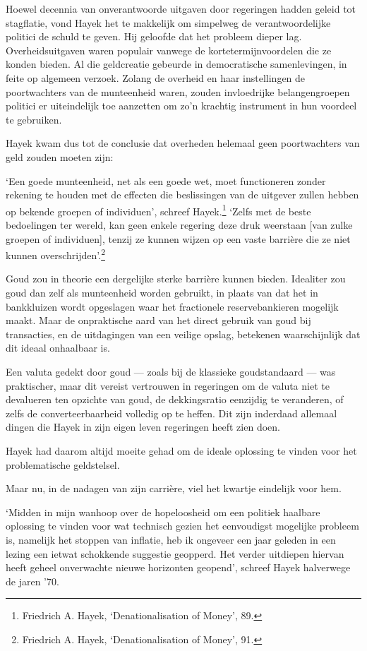 \documentclass[smalldemyvopaper,11pt,twoside,onecolumn,openright,extrafontsizes,hidelinks]{memoir}
\begin{document}
Hoewel decennia van onverantwoorde uitgaven door regeringen hadden
geleid tot stagflatie, vond Hayek het te makkelijk om simpelweg de
verantwoordelijke politici de schuld te geven. Hij geloofde dat het
probleem dieper lag. Overheidsuitgaven waren populair vanwege de
kortetermijnvoordelen die ze konden bieden. Al die geldcreatie gebeurde
in democratische samenlevingen, in feite op algemeen verzoek. Zolang de
overheid en haar instellingen de poortwachters van de munteenheid waren,
zouden invloedrijke belangengroepen politici er uiteindelijk toe
aanzetten om zo'n krachtig instrument in hun voordeel te gebruiken.

Hayek kwam dus tot de conclusie dat overheden helemaal geen
poortwachters van geld zouden moeten zijn:

`Een goede munteenheid, net als een goede wet, moet functioneren zonder
rekening te houden met de effecten die beslissingen van de uitgever
zullen hebben op bekende groepen of individuen', schreef
Hayek.\footnote{Friedrich A. Hayek, `Denationalisation of Money', 89.}
`Zelfs met de beste bedoelingen ter wereld, kan geen enkele regering
deze druk weerstaan {[}van zulke groepen of individuen{]}, tenzij ze
kunnen wijzen op een vaste barrière die ze niet kunnen
overschrijden'.\footnote{Friedrich A. \hspace{0pt}Hayek,
  `Denationalisation of Money', 91.}

Goud zou in theorie een dergelijke sterke barrière kunnen bieden.
Idealiter zou goud dan zelf als munteenheid worden gebruikt, in plaats
van dat het in bankkluizen wordt opgeslagen waar het fractionele
reservebankieren mogelijk maakt. Maar de onpraktische aard van het
direct gebruik van goud bij transacties, en de uitdagingen van een
veilige opslag, betekenen waarschijnlijk dat dit ideaal onhaalbaar is.

Een valuta gedekt door goud --- zoals bij de klassieke goudstandaard ---
was praktischer, maar dit vereist vertrouwen in regeringen om de valuta
niet te devalueren ten opzichte van goud, de dekkingsratio eenzijdig te
veranderen, of zelfs de converteerbaarheid volledig op te heffen. Dit
zijn inderdaad allemaal dingen die Hayek in zijn eigen leven regeringen
heeft zien doen.

Hayek had daarom altijd moeite gehad om de ideale oplossing te vinden
voor het problematische geldstelsel.

Maar nu, in de nadagen van zijn carrière, viel het kwartje eindelijk
voor hem.

`Midden in mijn wanhoop over de hopeloosheid om een politiek haalbare
oplossing te vinden voor wat technisch gezien het eenvoudigst mogelijke
probleem is, namelijk het stoppen van inflatie, heb ik ongeveer een jaar
geleden in een lezing een ietwat schokkende suggestie geopperd. Het
verder uitdiepen hiervan heeft geheel onverwachte nieuwe horizonten
geopend', schreef Hayek halverwege de jaren '70.
\end{document}
